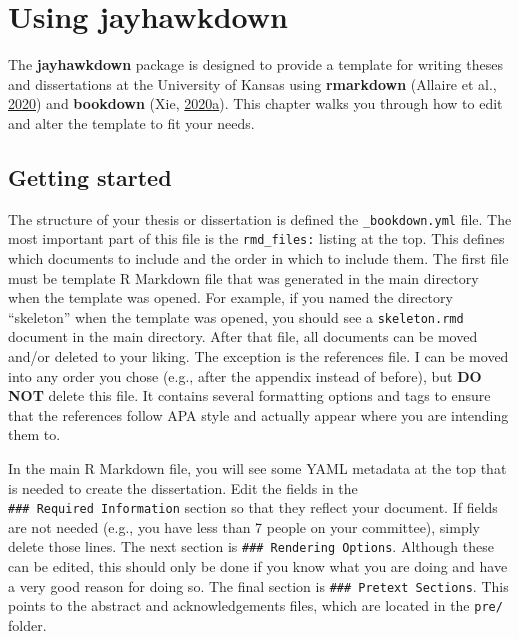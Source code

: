 \documentclass[12pt,english]{kuthesis}
\begin{document}
\hypertarget{using-jayhawkdown}{%
\chapter{Using jayhawkdown}\label{using-jayhawkdown}}

The \textbf{jayhawkdown} package is designed to provide a template for writing theses and dissertations at the University of Kansas using \textbf{rmarkdown} (Allaire et al., \protect\hyperlink{ref-R-rmarkdown}{2020}) and \textbf{bookdown} (Xie, \protect\hyperlink{ref-R-bookdown}{2020}\protect\hyperlink{ref-R-bookdown}{a}). This chapter walks you through how to edit and alter the template to fit your needs.

\hypertarget{getting-started}{%
\section{Getting started}\label{getting-started}}

The structure of your thesis or dissertation is defined the \texttt{\_bookdown.yml} file. The most important part of this file is the \texttt{rmd\_files:} listing at the top. This defines which documents to include and the order in which to include them. The first file must be template R Markdown file that was generated in the main directory when the template was opened. For example, if you named the directory ``skeleton'' when the template was opened, you should see a \texttt{skeleton.rmd} document in the main directory. After that file, all documents can be moved and/or deleted to your liking. The exception is the references file. I can be moved into any order you chose (e.g., after the appendix instead of before), but \textbf{DO NOT} delete this file. It contains several formatting options and tags to ensure that the references follow APA style and actually appear where you are intending them to.

In the main R Markdown file, you will see some YAML metadata at the top that is needed to create the dissertation. Edit the fields in the \texttt{\#\#\#\ Required\ Information} section so that they reflect your document. If fields are not needed (e.g., you have less than 7 people on your committee), simply delete those lines. The next section is \texttt{\#\#\#\ Rendering\ Options}. Although these can be edited, this should only be done if you know what you are doing and have a very good reason for doing so. The final section is \texttt{\#\#\#\ Pretext\ Sections}. This points to the abstract and acknowledgements files, which are located in the \texttt{pre/} folder.
\end{document}
